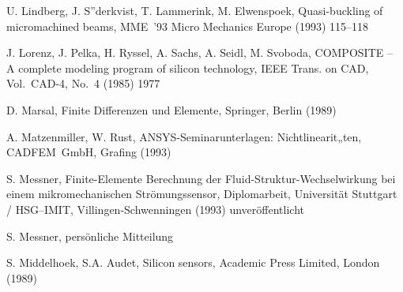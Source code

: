 \begin{thebibliography}{xxx}
 U. Lindberg, J. S”derkvist, T. Lammerink, M. Elwenspoek, Quasi-buckling of
 micromachined beams, MME~'93 Micro Mechanics Europe (1993) 115--118

 J. Lorenz, J. Pelka, H. Ryssel, A. Sachs, A. Seidl, M. Svoboda,
 {\sf COMPOSITE} -- A complete modeling program of silicon technology,
 IEEE Trans. on CAD, Vol.~CAD-4, No.~4 (1985) 1977


 D. Marsal, Finite Differenzen und Elemente, Springer, Berlin (1989)



 A. Matzenmiller, W. Rust, {\sf ANSYS}-Seminarunterlagen: Nichtlinearit„ten,
 CADFEM~GmbH, Grafing (1993)




 S. Messner, Finite-Elemente Berechnung der Fluid-\-Struktur-\-Wechselwirkung
 bei einem mikromechanischen Strömungssensor, Diplomarbeit,
 Universität Stuttgart / HSG--IMIT, Villingen-Schwenningen (1993)
 unveröffentlicht

 S. Messner, persönliche Mitteilung

 S. Middelhoek, S.A. Audet, Silicon sensors, Academic Press Limited,
 London (1989)



\end{thebibliography}
